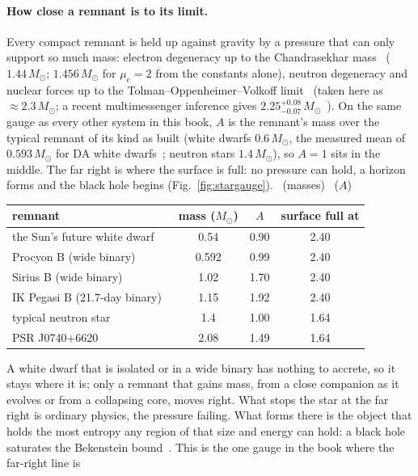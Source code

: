 \paragraph{How close a remnant is to its limit.} Every compact remnant is held up against gravity by a pressure that can only support so much
mass: electron degeneracy up to the Chandrasekhar mass~\cite{Chandrasekhar1931} ($1.44\,M_\odot$; $1.456\,M_\odot$ for $\mu_e=2$ from the constants alone), neutron
degeneracy and nuclear forces up to the Tolman--Oppenheimer--Volkoff limit~\cite{Tolman1939,OppenheimerVolkoff1939} (taken here as $\approx2.3\,M_\odot$; a recent multimessenger
inference gives $2.25^{+0.08}_{-0.07}\,M_\odot$~\cite{Fan2024}). On the same gauge as every other system in this book, $A$ is the remnant's mass over the typical remnant of its kind as built
(white dwarfs $0.6\,M_\odot$, the measured mean of $0.593\,M_\odot$ for DA white dwarfs~\cite{Kepler2007}; neutron stars $1.4\,M_\odot$), so $A=1$ sits in the middle. The far right is where the surface is
full: no pressure can hold, a horizon forms and the black hole begins (Fig.~\ref{fig:stargauge}). \observed\ (masses) \calc\ ($A$)
\begin{center}\small\begin{tabular}{lccc}\toprule
remnant & mass ($M_\odot$) & $A$ & surface full at\\\midrule
the Sun's future white dwarf~\cite{Sackmann1993} & 0.54 & 0.90 & 2.40\\
Procyon B (wide binary)~\cite{Bond2015} & 0.592 & 0.99 & 2.40\\
Sirius B (wide binary)~\cite{Bond2017} & 1.02 & 1.70 & 2.40\\
IK Pegasi B (21.7-day binary)~\cite{Landsman1993} & 1.15 & 1.92 & 2.40\\
typical neutron star & 1.4 & 1.00 & 1.64\\
PSR J0740+6620~\cite{Fonseca2021} & 2.08 & 1.49 & 1.64\\\bottomrule
\end{tabular}\end{center}
A white dwarf that is isolated or in a wide binary has nothing to accrete, so it stays where it is; only a remnant that gains mass, from a close companion
as it evolves or from a collapsing core, moves right. What stops the star at the far right is ordinary physics, the pressure failing. What forms there is the object that holds the most entropy any
region of that size and energy can hold: a black hole saturates the Bekenstein bound~\cite{Bekenstein1981}. This is the one gauge in the book where the far-right line is
